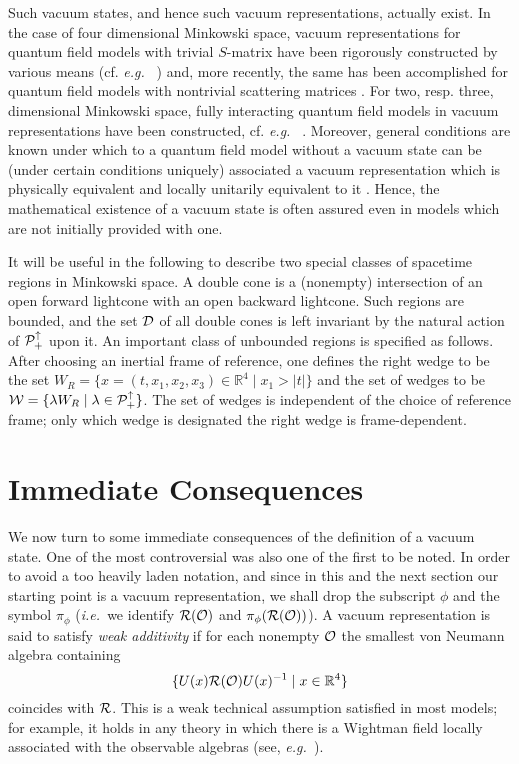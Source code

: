 \documentclass[12pt]{article}
\newcommand{\ie}{{\it i.e.\ }}
\newcommand{\eg}{{\it e.g.\ }}
\def\Ds{{\cal D}}
\def\Os{{\cal O}}
\def\Ps{{\cal P}}
\def\Rs{{\cal R}}
\def\Ws{{\cal W}}
\def\Pid{{\Ps_+ ^{\uparrow}}}
\def\RR{{\mathbb R}}
\begin{document}
     Such vacuum states, and hence such vacuum representations,
actually exist. In the case of four dimensional Minkowski space,
vacuum representations for quantum field models with trivial
$S$-matrix have been rigorously constructed by various means (cf. \eg
\cite{WiGa,Ar2,BLT,GlJa2,BrGuLo3}) and, more recently, the same has been
accomplished for quantum field models with nontrivial scattering
matrices \cite{GrLe,BuSu2,BS6}. For two, resp. three, dimensional
Minkowski space, fully interacting quantum field models in vacuum
representations have been constructed, cf. \eg
\cite{GlJa,GlJa2,Le3,BLT}. Moreover, general conditions are known under
which to a quantum field model without a vacuum state can be (under
certain conditions uniquely) associated a vacuum representation which
is physically equivalent and locally unitarily equivalent to it
\cite{BuFr,BuWa,Dy}. Hence, the mathematical existence of a vacuum
state is often assured even in models which are not initially provided
with one.

     It will be useful in the following to describe two special
classes of spacetime regions in Minkowski space. A double cone is a 
(nonempty) intersection of an open forward lightcone with an open backward
lightcone. Such regions are bounded, and the set $\Ds$ of all double
cones is left invariant by the natural action of $\Pid$ upon it. An
important class of unbounded regions is specified as follows.
After choosing an inertial frame of reference, one defines the right wedge
to be the set 
$W_R = \{ x = (t,x_1,x_2,x_3) \in \RR^4 \mid x_1 > \vert t \vert \}$
and the set of wedges to be 
$\Ws = \{ \lambda W_R \mid \lambda \in \Pid \}$.
The set of wedges is independent of the choice of reference frame;
only which wedge is designated the right wedge is frame-dependent.

\section{Immediate Consequences} \label{first}

     We now turn to some immediate consequences of the definition of a
vacuum state. One of the most controversial was also one of the first
to be noted. In order to avoid a too heavily laden notation, and since
in this and the next section our starting point is a vacuum
representation, we shall drop the subscript $\phi$ and the symbol
$\pi_\phi$ (\ie we identify $\Rs(\Os)$ and $\pi_\phi(\Rs(\Os))$). A 
vacuum representation is said to satisfy {\it weak additivity} if for 
each nonempty $\Os$ the smallest von Neumann algebra containing
%
$$\{ U(x) \Rs(\Os) U(x)^{-1} \mid x \in \RR^4 \} $$
%
coincides with $\Rs$. This is a weak technical assumption satisfied in 
most models; for example, it holds in any theory in which there is a 
Wightman field locally associated with the observable algebras 
(see, \eg \cite{BW1,BW2,DrSuWi}). 
\end{document}
